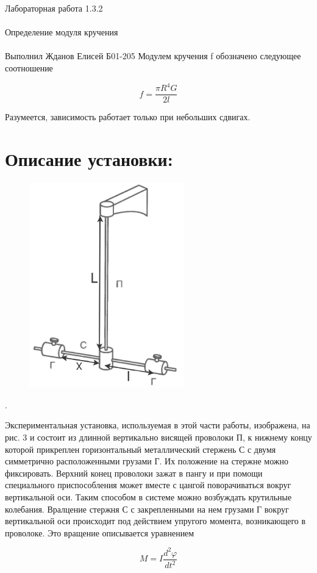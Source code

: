 \documentclass{astroedu-lab}
\begin{document}
\begin{problem}{\huge Лабораторная работа 1.3.2\\\\Определение модуля кручения\\\\Выполнил Жданов Елисей Б01-205}
Модулем кручения f обозначено следующее соотношение

\begin{equation}
	f = \frac{\pi R^4 G}{2 l}
\end{equation}

Разумеется, зависимость работает только при небольших сдвигах.

\section{Описание установки:}

\begin{figure}
\includegraphics[width=0.6\textwidth]{state_1.png}
\caption{}
\label{ris:image}
\end{figure}.

Экспериментальная установка, используемая в этой части работы,
изображена, на рис. 3 и состоит из длинной вертикально висящей проволоки П, к нижнему концу которой прикреплен горизонтальный металлический стержень С с двумя симметрично расположенными грузами
Г. Их положение на стержне можно фиксировать. Верхний конец проволоки зажат в пангу и при помощи специального приспособления может
вместе с цангой поворачиваться вокруг вертикальной оси. Таким способом в системе можно возбуждать крутильные колебания. Вралцение стержня С с закрепленными на нем грузами Г вокруг вертикальной оси происходит под действием упругого момента, возникающего в проволоке. Это вращение описывается уравнением

\begin{equation}
	M = I \frac{d^2 \varphi}{d t^2}
\end{equation}


\end{problem}
\end{document}

